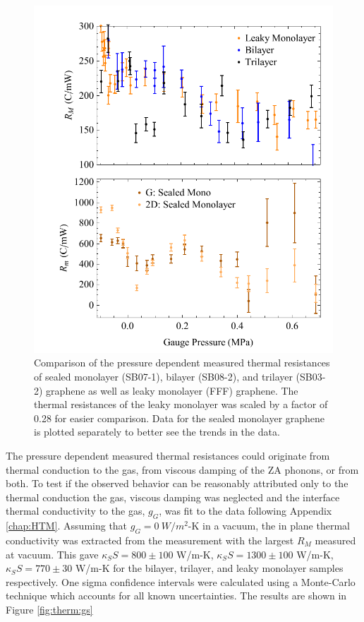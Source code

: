 \begin{figure}
	\begin{center}
	\includegraphics{Figs_Thermal/Rs.pdf}
	\end{center}
	\caption[Pressure dependent measured thermal resistances of mono-, bi-, and trilayer graphene]{\label{fig:therm:Rs}
		Comparison of the pressure dependent measured thermal resistances of sealed monolayer (SB07-1), bilayer (SB08-2), and trilayer (SB03-2) graphene as well as leaky monolayer (FFF) graphene.
		The thermal resistances of the leaky monolayer was scaled by a factor of 0.28 for easier comparison.
		Data for the sealed monolayer graphene is plotted separately to better see the trends in the data.
	}
\end{figure}

The pressure dependent measured thermal resistances could originate from thermal conduction to the gas, from viscous damping of the ZA phonons, or from both.
To test if the observed behavior can be reasonably attributed only to the thermal conduction the gas, viscous damping was neglected and the interface thermal conductivity to the gas, $g_G$, was fit to the data following Appendix \ref{chap:HTM}.
Assuming that $g_G=0 \ W/m^2$-K in a vacuum, the in plane thermal conductivity was extracted from the measurement with the largest $R_M$ measured at vacuum.
This gave $\kappa_SS=800 \pm 100$ W/m-K, $\kappa_SS=1300 \pm 100$ W/m-K, $\kappa_SS= 770 \pm 30$ W/m-K for the bilayer, trilayer, and leaky monolayer samples respectively. 
One sigma confidence intervals were calculated using a Monte-Carlo technique which accounts for all known uncertainties.
The results are shown in Figure \ref{fig:therm:gs}


